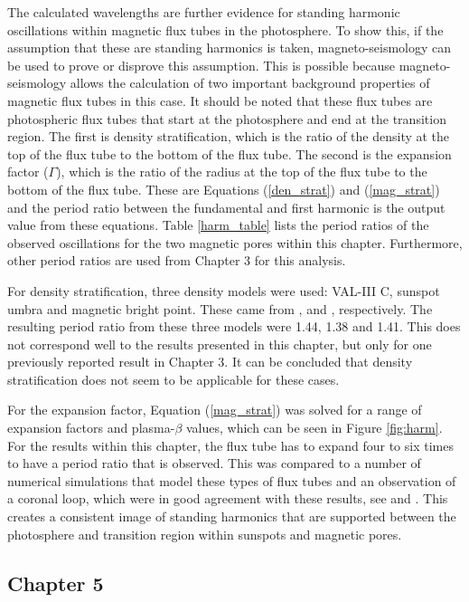     The calculated wavelengths are further evidence for standing harmonic oscillations within magnetic flux tubes in the photosphere.
    To show this, if the assumption that these are standing harmonics is taken, magneto-seismology can be used to prove or disprove this assumption.
    This is possible because magneto-seismology allows the calculation of two important background properties of magnetic flux tubes in this case.
    It should be noted that these flux tubes are photospheric flux tubes that start at the photosphere and end at the transition region.
    The first is density stratification, which is the ratio of the density at the top of the flux tube to the bottom of the flux tube.
    The second is the expansion factor ($\Gamma$), which is the ratio of the radius at the top of the flux tube to the bottom of the flux tube.
    These are Equations (\ref{den_strat}) and (\ref{mag_strat}) and the period ratio between the fundamental and first harmonic is the output value from these equations.
    Table \ref{harm_table} lists the period ratios of the observed oscillations for the two magnetic pores within this chapter.
    Furthermore, other period ratios are used from Chapter 3 for this analysis.

	For density stratification, three density models were used: VAL-III C, sunspot umbra and magnetic bright point.
	These came from \cite{1981ApJS...45..635V}, \cite{Maltby1986} and \cite{GFME13a,GFE14}, respectively.
	The resulting period ratio from these three models were 1.44, 1.38 and 1.41.
	This does not correspond well to the results presented in this chapter, but only for one previously reported result in Chapter 3.
	It can be concluded that density stratification does not seem to be applicable for these cases.

	For the expansion factor, Equation (\ref{mag_strat}) was solved for a range of expansion factors and plasma-$\beta$ values, which can be seen in Figure \ref{fig:harm}.
	For the results within this chapter, the flux tube has to expand four to six times to have a period ratio that is observed.
	This was compared to a number of numerical simulations that model these types of flux tubes and an observation of a coronal loop, which were in good agreement with these results, see \cite{khomenko,fedun2,fedun1} and \cite{2008A&A...489L..57K}.
	This creates a consistent image of standing harmonics that are supported between the photosphere and transition region within sunspots and magnetic pores.

	\subsection{Chapter 5}
    
